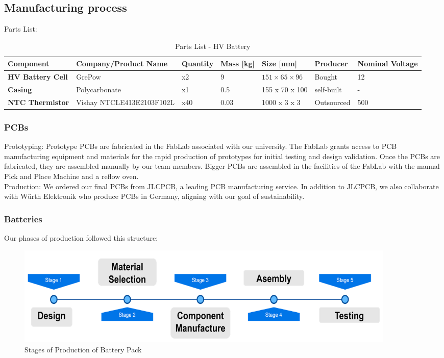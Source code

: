 \subsection{Manufacturing process}
Parts List: \\
\begin{table}[ht]
    \centering
    \begin{adjustbox}{width=\textwidth}
    \begin{tabular}{|>{\bfseries}m{2cm}|m{4cm}|m{1.5cm}|m{1.5cm}|m{2cm}|m{2cm}|m{2cm}|}
    \hline
    Component & Company/Product Name & Quantity & Mass [kg] & Size [mm] &  Producer & Nominal Voltage \\
    \hline
    HV Battery Cell & GrePow & x2 & 9 & \(151 \times 65 \times 96\) &  Bought & 12 \\
    Casing & Polycarbonate & x1 & 0.5 & 155 x 70 x 100 & self-built & - \\
    NTC Thermistor & Vishay NTCLE413E2103F102L & x40 & 0.03 & 1000 x 3 x 3 & Outsourced & 500 \\
    \hline
    \end{tabular}
    \end{adjustbox}
    \caption{Parts List - HV Battery}
    \label{table:hvbattery-components}
\end{table}

\subsubsection{PCBs}
Prototyping: Prototype PCBs are fabricated in the FabLab associated with our university. The FabLab grants access to PCB manufacturing equipment and materials for the rapid production of prototypes for initial testing and design validation. Once the PCBs are fabricated, they are assembled manually by our team members. Bigger PCBs are assembled in the facilities of the FabLab with the manual Pick and Place Machine and a reflow oven. \\
Production: We ordered our final PCBs from JLCPCB, a leading PCB manufacturing service. In addition to JLCPCB, we also collaborate with Würth Elektronik who produce PCBs in Germany, aligning with our goal of sustainability.

\subsubsection{Batteries}
Our phases of production followed this structure:
\begin{figure}[H]
    \centering
    \includegraphics[width=0.9\textwidth]{texfiles/elec/eimg/BatteryProduction}
    \caption{Stages of Production of Battery Pack}
    \label{img: batteryproduction}
\end{figure}

